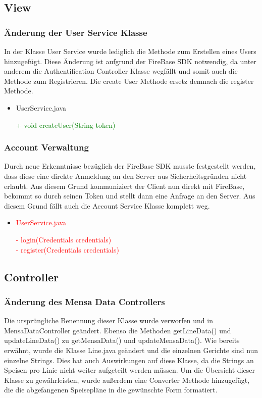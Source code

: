 \documentclass[a4paper]{scrreprt}
\begin{document}
\subsection{View}

\subsubsection{Änderung der User Service Klasse}
In der Klasse User Service wurde lediglich die Methode zum Erstellen eines Users hinzugefügt. Diese Änderung ist aufgrund der FireBase SDK notwendig, da unter anderem die Authentification Controller Klasse wegfällt und somit auch die Methode zum Registrieren. Die create User Methode ersetz demnach die register Methode.

\begin{itemize}
\item{UserService.java}

\textcolor{green}{+ void createUser(String token)}\\
\end{itemize}

\subsubsection{Account Verwaltung}
Durch neue Erkenntnisse bezüglich der FireBase SDK musste festgestellt werden, dass diese eine direkte Anmeldung an den Server aus Sicherheitsgründen nicht erlaubt. Aus diesem Grund kommuniziert der Client nun direkt mit FireBase, bekommt so durch seinen Token und stellt dann eine Anfrage an den Server. Aus diesem Grund fällt auch die Account Service Klasse komplett weg.

\begin{itemize}
\item\textcolor{red}{UserService.java}

\textcolor{red}{- login(Credentials credentials)}\\
\textcolor{red}{- register(Credentials credentials)}
\end{itemize}

\subsection{Controller}
\subsubsection{Änderung  des Mensa Data Controllers}
Die ursprüngliche Benennung dieser Klasse wurde verworfen und in MensaDataController geändert. Ebenso die Methoden getLineData() und updateLineData() zu getMensaData() und updateMensaData(). Wie bereits erwähnt, wurde die Klasse Line.java geändert und die einzelnen Gerichte sind nun einzelne Strings. Dies hat auch Auswirkungen auf diese Klasse, da die Strings an Speisen pro Linie nicht weiter aufgeteilt werden müssen. Um die Übersicht dieser Klasse zu gewährleisten, wurde außerdem eine Converter Methode hinzugefügt, die die abgefangenen Speisepläne in die gewünschte Form formatiert.
\end{document}
